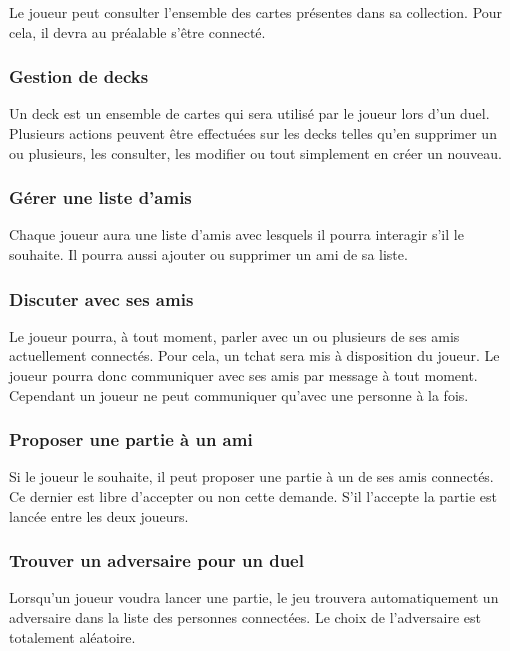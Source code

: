 \documentclass[11pt,a4paper]{article}
\begin{document}
Le joueur peut consulter l'ensemble des cartes présentes dans sa
collection. Pour cela, il devra au préalable s'être connecté.


\subsubsection*{Gestion de decks}

Un deck est un ensemble de cartes qui sera utilisé par le joueur
lors d'un duel. Plusieurs actions peuvent être effectuées sur les
decks telles qu'en supprimer un ou plusieurs, les consulter, les
modifier ou tout simplement en créer un nouveau.


\subsubsection*{Gérer une liste d'amis}

Chaque joueur aura une liste d'amis avec lesquels il pourra
interagir s'il le souhaite. Il pourra aussi ajouter ou supprimer un ami de sa liste.


\subsubsection*{Discuter avec ses amis}

Le joueur pourra, à tout moment, parler avec un ou plusieurs de ses
amis actuellement connectés. Pour cela, un tchat sera mis à
disposition du joueur.  Le joueur pourra donc communiquer avec ses
amis par message à tout moment. Cependant un joueur ne peut communiquer qu'avec une personne à la fois.
\subsubsection*{Proposer une partie à un ami}

Si le joueur le souhaite, il peut proposer une partie à un de ses
amis connectés. Ce dernier est libre d'accepter ou non cette demande.
S'il l'accepte la partie est lancée entre les deux joueurs.


\subsubsection*{Trouver un adversaire pour un duel}

Lorsqu'un joueur voudra lancer une partie, le jeu trouvera
automatiquement un adversaire dans la liste des personnes
connectées. Le choix de l'adversaire est totalement aléatoire.
\end{document}
